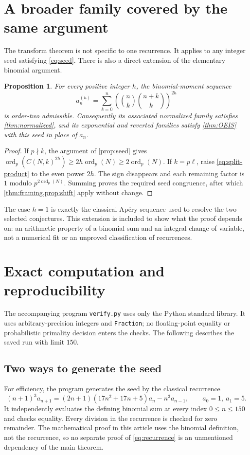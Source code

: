 \documentclass[11pt,letterpaper]{article}
\numberwithin{equation}{section}
\newtheorem{proposition}[proposition]{Proposition}
\theoremstyle{definition}
\theoremstyle{remark}
\newcommand{\vp}{\operatorname{ord}_p}
\begin{document}
\section{A broader family covered by the same argument}\label{sec:generalization}
The transform theorem is not specific to one recurrence. It applies to
any integer seed satisfying \eqref{eq:seed}. There is also a direct
extension of the elementary binomial argument.

\begin{proposition}\label{prop:moments}
For every positive integer $h$, the binomial-moment sequence
\[
 a_n^{(h)}=\sum_{k=0}^n
       \left(\binom nk\binom{n+k}k\right)^{2h}
\]
is order-two admissible. Consequently its associated normalized family
satisfies \cref{thm:normalized}, and its exponential and reverted families
satisfy \cref{thm:OEIS} with this seed in place of $a_n$.
\end{proposition}
\begin{proof}
If $p\nmid k$, the argument of \cref{prop:seed} gives
$\vp(C(N,k)^{2h})\ge2h\vp(N)\ge2\vp(N)$.
If $k=p\ell$, raise \eqref{eq:split-product} to the even power $2h$.
The sign disappears and each remaining factor is $1$ modulo
$p^{2\vp(N)}$. Summing proves the required seed congruence, after which
\cref{thm:framing,prop:shift} apply without change.
\end{proof}

The case $h=1$ is exactly the classical Ap\'ery sequence used to resolve
the two selected conjectures. This extension is included to show what
the proof depends on: an arithmetic property of a binomial sum and an
integral change of variable, not a numerical fit or an unproved
classification of recurrences.

\section{Exact computation and reproducibility}\label{sec:computations}
The accompanying program \texttt{verify.py} uses only the Python standard
library. It uses arbitrary-precision integers and \texttt{Fraction}; no
floating-point equality or probabilistic primality decision enters the
checks. The following describes the saved run with limit $150$.

\subsection{Two ways to generate the seed}
For efficiency, the program generates the seed by the classical recurrence
\cite{liu}
\begin{equation}\label{eq:recurrence}
 (n+1)^3a_{n+1}
 =(2n+1)(17n^2+17n+5)a_n-n^3a_{n-1},
 \qquad a_0=1,\ a_1=5.
\end{equation}
It independently evaluates the defining binomial sum at every index
$0\le n\le150$ and checks equality. Every division in the recurrence is
checked for zero remainder. The mathematical proof in this article uses
the binomial definition, not the recurrence, so no separate proof of
\eqref{eq:recurrence} is an unmentioned dependency of the main theorem.
\end{document}
